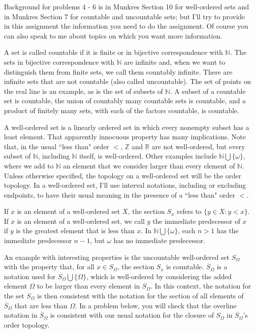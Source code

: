 \documentclass{amsart}
\theoremstyle{plain}
\theoremstyle{definition}
\theoremstyle{remark}
\begin{document}
\vspace{.25in}
Background for problems 4 - 6 is in Munkres Section 10 for well-ordered sets and in Munkres Section 7 for countable and uncountable sets; but I'll try to provide in this assignment the information you need to do the assignment. Of course you can also speak to me about topics on which you want more information. 

A set is called countable if it is finite or in bijective correspondence with $\mathbb N$. The sets in bijective correspondence with $\mathbb N$ are infinite and, when we want to distinguish them from finite sets, we call them countably infinite. There are infinite sets that are not countable (also called uncountable). The set of points on the real line is an example, as is the set of subsets of $\mathbb N$. A subset of a countable set is countable, the union of countably many countable sets is countable, and a product of finitely many sets, with each of the factors countable, is countable. 

A well-ordered set is a linearly ordered set in which every nonempty subset has a least element. That apparently innocuous property has many implications. Note that, in the usual ``less than" order $<$, $\mathbb Z$ and $\mathbb R$ are not well-ordered, but every subset of $\mathbb N$, including $\mathbb N$ itself, is well-ordered. Other examples include $\mathbb N \bigcup \{ \omega\}$, where we add to $\mathbb N$ an element that we consider larger than every element of $\mathbb N$. Unless otherwise specified, the topology on a well-ordered set will be the order topology. In a well-ordered set, I'll use interval notations, including or excluding endpoints, to have their usual meaning in the presence of a ``less than" order $<$. 

If $x$ is an element of a well-ordered set $X$, the section $S_x$ refers to $\{ y \in X : y < x\}$.  If $x$ is an element of a well-ordered set, we call $y$ the immediate predecessor of $x$ if $y$ is the greatest element that is less than $x$. In $\mathbb N \bigcup \{ \omega\}$, each $n > 1$ has the immediate predecessor $n-1$, but $\omega$ has no immediate predecessor. 

An example with interesting properties is the uncountable well-ordered set $S_{\Omega}$ with the property that, for all $x \in S_{\Omega}$, the section $S_x$ is countable. $\overline{S} _{\Omega}$ is a notation used for $S_{\Omega} \bigcup \{ \Omega\}$, which is well-ordered by considering the added element $\Omega$ to be larger than every element in $S_{\Omega}$. In this context, the notation for the set $S_{\Omega}$ is then consistent with the notation for the section of all elements of $\overline{S} _{\Omega}$ that are less than $\Omega$. In a problem below, you will check that the overline notation in $\overline{S} _{\Omega}$ is consistent with our usual notation for the closure of $S_{\Omega}$ in $\overline{S} _{\Omega}$'s order topology. 
\end{document}
